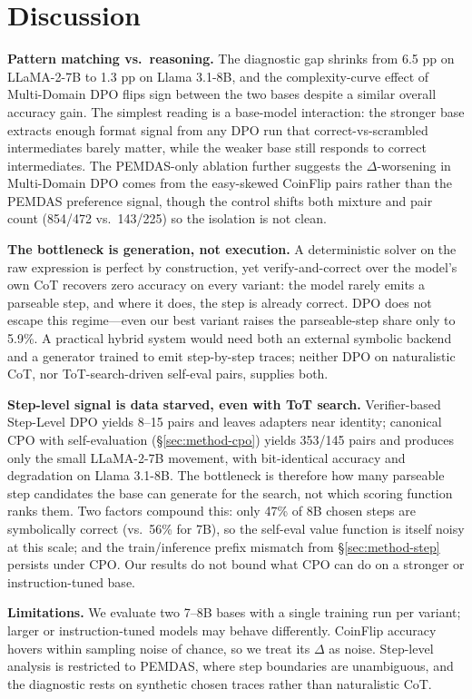 \documentclass{article}
\begin{document}
\section{Discussion}

\textbf{Pattern matching vs.\ reasoning.} The diagnostic gap shrinks from 6.5 pp on LLaMA-2-7B to 1.3 pp on Llama 3.1-8B, and the complexity-curve effect of Multi-Domain DPO flips sign between the two bases despite a similar overall accuracy gain. The simplest reading is a base-model interaction: the stronger base extracts enough format signal from any DPO run that correct-vs-scrambled intermediates barely matter, while the weaker base still responds to correct intermediates. The PEMDAS-only ablation further suggests the $\Delta$-worsening in Multi-Domain DPO comes from the easy-skewed CoinFlip pairs rather than the PEMDAS preference signal, though the control shifts both mixture and pair count (854/472 vs.\ 143/225) so the isolation is not clean.

\textbf{The bottleneck is generation, not execution.} A deterministic solver on the raw expression is perfect by construction, yet verify-and-correct over the model's own CoT recovers zero accuracy on every variant: the model rarely emits a parseable step, and where it does, the step is already correct. DPO does not escape this regime---even our best variant raises the parseable-step share only to 5.9\%. A practical hybrid system would need both an external symbolic backend and a generator trained to emit step-by-step traces; neither DPO on naturalistic CoT, nor ToT-search-driven self-eval pairs, supplies both.

\textbf{Step-level signal is data starved, even with ToT search.} Verifier-based Step-Level DPO yields 8--15 pairs and leaves adapters near identity; canonical CPO with self-evaluation (§\ref{sec:method-cpo}) yields 353/145 pairs and produces only the small LLaMA-2-7B movement, with bit-identical accuracy and degradation on Llama 3.1-8B. The bottleneck is therefore how many parseable step candidates the base can generate for the search, not which scoring function ranks them. Two factors compound this: only 47\% of 8B chosen steps are symbolically correct (vs.\ 56\% for 7B), so the self-eval value function is itself noisy at this scale; and the train/inference prefix mismatch from §\ref{sec:method-step} persists under CPO. Our results do not bound what CPO can do on a stronger or instruction-tuned base.

\textbf{Limitations.} We evaluate two 7--8B bases with a single training run per variant; larger or instruction-tuned models may behave differently. CoinFlip accuracy hovers within sampling noise of chance, so we treat its $\Delta$ as noise. Step-level analysis is restricted to PEMDAS, where step boundaries are unambiguous, and the diagnostic rests on synthetic chosen traces rather than naturalistic CoT.
\end{document}
